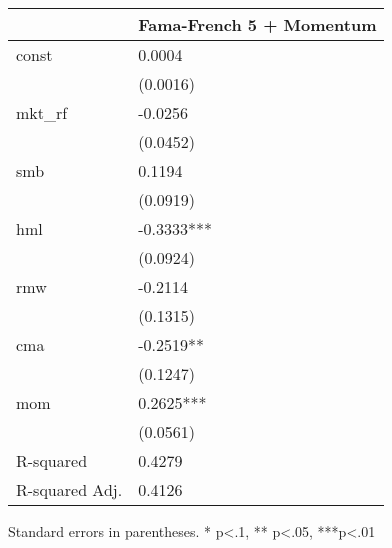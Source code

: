 \begin{table}
\caption{}
\label{}
\begin{center}
\begin{tabular}{ll}
\hline
               & Fama-French 5 + Momentum  \\
\hline
const          & 0.0004                    \\
               & (0.0016)                  \\
mkt\_rf        & -0.0256                   \\
               & (0.0452)                  \\
smb            & 0.1194                    \\
               & (0.0919)                  \\
hml            & -0.3333***                \\
               & (0.0924)                  \\
rmw            & -0.2114                   \\
               & (0.1315)                  \\
cma            & -0.2519**                 \\
               & (0.1247)                  \\
mom            & 0.2625***                 \\
               & (0.0561)                  \\
R-squared      & 0.4279                    \\
R-squared Adj. & 0.4126                    \\
\hline
\end{tabular}
\end{center}
\end{table}
\bigskip
Standard errors in parentheses. \newline 
* p<.1, ** p<.05, ***p<.01